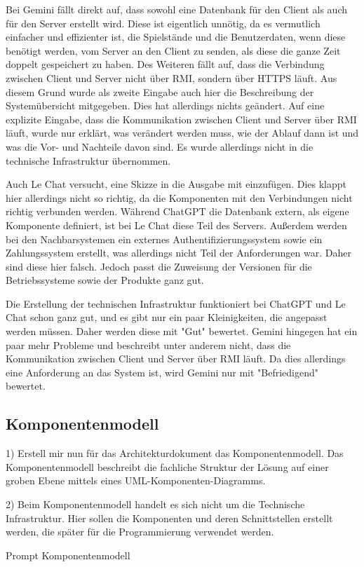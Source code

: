 Bei Gemini fällt direkt auf, dass sowohl eine Datenbank für den Client als auch für den Server erstellt wird. Diese ist eigentlich unnötig, da es 
vermutlich einfacher und effizienter ist, die Spielstände und die Benutzerdaten, wenn diese benötigt werden, vom Server an den Client zu senden, als 
diese die ganze Zeit doppelt gespeichert zu haben. Des Weiteren fällt auf, dass die Verbindung zwischen Client und Server nicht über RMI, sondern über 
HTTPS läuft. Aus diesem Grund wurde als zweite Eingabe auch hier die Beschreibung der Systemübersicht mitgegeben. Dies hat allerdings nichts geändert. 
Auf eine explizite Eingabe, dass die Kommunikation zwischen Client und Server über RMI läuft, wurde nur erklärt, was verändert werden muss, wie der Ablauf 
dann ist und was die Vor- und Nachteile davon sind. Es wurde allerdings nicht in die technische Infrastruktur übernommen.

Auch Le Chat versucht, eine Skizze in die Ausgabe mit einzufügen. Dies klappt hier allerdings nicht so richtig, da die Komponenten mit den 
Verbindungen nicht richtig verbunden werden. Während ChatGPT die Datenbank extern, als eigene Komponente definiert, ist bei Le Chat diese 
Teil des Servers. Außerdem werden bei den Nachbarsystemen ein externes Authentifizierungssystem sowie ein Zahlungssystem erstellt, was 
allerdings nicht Teil der Anforderungen war. Daher sind diese hier falsch. Jedoch passt die Zuweisung der Versionen für die 
Betriebssysteme sowie der Produkte ganz gut.

Die Erstellung der technischen Infrastruktur funktioniert bei ChatGPT und Le Chat schon ganz gut, und es gibt nur ein paar Kleinigkeiten, die 
angepasst werden müssen. Daher werden diese mit "Gut" bewertet. Gemini hingegen hat ein paar mehr Probleme und beschreibt unter anderem nicht, 
dass die Kommunikation zwischen Client und Server über RMI läuft. Da dies allerdings eine Anforderung an das System ist, wird Gemini nur mit 
"Befriedigend" bewertet.

\subsection*{Komponentenmodell}

\begin{prompt}[H]
    \begin{tcolorbox}[colback=gray!20, colframe=gray!20, boxrule=0pt, sharp corners] 
        1) Erstell mir nun für das Architekturdokument das Komponentenmodell. Das Komponentenmodell beschreibt die fachliche Struktur der Lösung auf 
        einer groben Ebene mittels eines UML-Komponenten-Diagramms.
        
        2) Beim Komponentenmodell handelt es sich nicht um die Technische Infrastruktur. Hier sollen die Komponenten und deren Schnittstellen erstellt 
        werden, die später für die Programmierung verwendet werden.
        \vfill
    \end{tcolorbox}
    \caption{Prompt Komponentenmodell}
    \label{Prompt Komponentenmodell}
\end{prompt}

